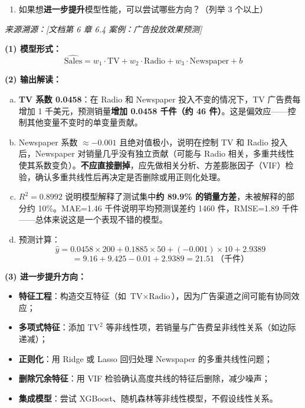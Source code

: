 \documentclass[a4paper,11pt]{ctexart}
\begin{document}
\begin{problembox}
\begin{enumerate}[(1)]
        \item 如果想\textbf{进一步提升}模型性能，可以尝试哪些方向？（列举 3 个以上）
    \end{enumerate}
    {\color{gray}\small\textit{来源溯源：[文档第 6 章 6.4 案例：广告投放效果预测]}}
\end{problembox}

\begin{solutionbox}[参考答案与详细解析]
    \textbf{(1) 模型形式：}
    \[
    \widehat{\text{Sales}} = w_1\cdot\text{TV} + w_2\cdot\text{Radio} + w_3\cdot\text{Newspaper} + b
    \]

    \textbf{(2) 输出解读：}
    \begin{enumerate}[a.]
        \item \textbf{TV 系数 0.0458}：在 Radio 和 Newspaper 投入不变的情况下，TV 广告费每增加 1 千美元，预测销量\textbf{增加 0.0458 千件（约 46 件）}。这是偏效应——控制其他变量不变时的单变量贡献。
        \item Newspaper 系数 $\approx -0.001$ 且绝对值极小，说明在控制 TV 和 Radio 投入后，Newspaper 对销量几乎没有独立贡献（可能与 Radio 相关，多重共线性使其系数变负）。\textbf{不应直接删掉}，应先做相关分析、方差膨胀因子（VIF）检验，确认多重共线性后再决定是否删除或用正则化处理。
        \item $R^2=0.8992$ 说明模型解释了测试集中\textbf{约 89.9\% 的销量方差}，未被解释的部分约 10\%。MAE=1.46 千件说明平均预测误差约 1460 件，RMSE=1.89 千件——总体来说这是一个表现不错的模型。
        \item 预测计算：
        \[
        \hat{y} = 0.0458\times200 + 0.1885\times50 + (-0.001)\times10 + 2.9389
        \]
        \[
        = 9.16 + 9.425 - 0.01 + 2.9389 = \mathbf{21.51}\ \text{（千件）}
        \]
    \end{enumerate}

    \textbf{(3) 进一步提升方向：}
    \begin{itemize}
        \item \textbf{特征工程}：构造交互特征（如 $\text{TV}\times\text{Radio}$），因为广告渠道之间可能有协同效应；
        \item \textbf{多项式特征}：添加 $\text{TV}^2$ 等非线性项，若销量与广告费呈非线性关系（如边际递减）；
        \item \textbf{正则化}：用 Ridge 或 Lasso 回归处理 Newspaper 的多重共线性问题；
        \item \textbf{删除冗余特征}：用 VIF 检验确认高度共线的特征后删除，减少噪声；
        \item \textbf{集成模型}：尝试 XGBoost、随机森林等非线性模型，不假设线性关系。
    \end{itemize}
\end{solutionbox}
\end{document}
